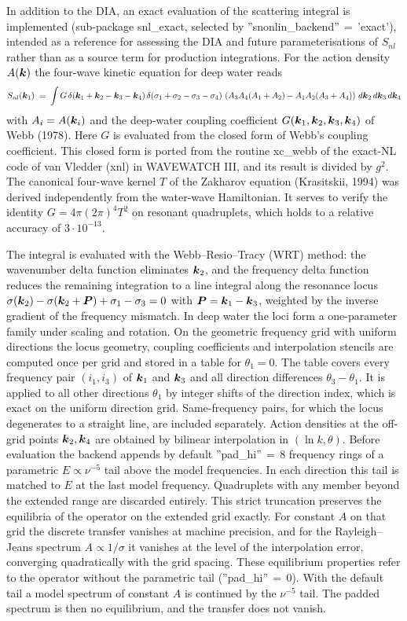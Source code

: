 \documentclass[12pt]{article}
\newcommand{\beq}  { \begin{eqnarray} }
\newcommand{\eeq}  { \end{eqnarray}}
\renewcommand{\v}[1]{{\mbox{\boldmath$ #1 $}}}  %
\newcommand{\lk}{\left(}
\newcommand{\rk}{\right)}
\begin{document}
In addition to the DIA, an exact evaluation of the scattering integral is
implemented (sub-package snl\_exact, selected by
''snonlin\_backend''$\,=\,$'exact'), intended as a reference for assessing the
DIA and future parameterisations of $S_{nl}$ rather than as a source term for
production integrations.
For the action density $A(\v k)$ the four-wave kinetic equation for deep water
reads
\beq \label{eq:snl_exact}
 S_{nl}(\v k_1) \;=\; \int G\,
 \delta(\v k_1+\v k_2-\v k_3-\v k_4)\, \delta(\sigma_1+\sigma_2-\sigma_3-\sigma_4)\,
 \lk A_3 A_4 (A_1+A_2) - A_1 A_2 (A_3+A_4) \rk \, d\v k_2\, d\v k_3\, d\v k_4
\eeq
with $A_i = A(\v k_i)$ and the deep-water coupling coefficient
$G(\v k_1,\v k_2,\v k_3,\v k_4)$ of Webb (1978).
Here $G$ is evaluated from the closed form of Webb's coupling coefficient.
This closed form is ported from the routine xc\_webb of the exact-NL code of
van Vledder (xnl) in WAVEWATCH III, and its result is divided by $g^2$.
The canonical four-wave kernel $T$ of the Zakharov equation (Krasitskii, 1994)
was derived independently from the water-wave Hamiltonian.
It serves to verify the identity $G = 4 \pi (2\pi)^4 T^2$ on resonant
quadruplets, which holds to a relative accuracy of $3 \cdot 10^{-13}$.

The integral is evaluated with the Webb--Resio--Tracy (WRT) method: the
wavenumber delta function eliminates $\v k_2$, and the frequency delta function
reduces the remaining integration to a line integral along the resonance locus
$\sigma(\v k_2) - \sigma(\v k_2 + \v P) + \sigma_1 - \sigma_3 = 0$ with
$\v P = \v k_1 - \v k_3$, weighted by the inverse gradient of the frequency
mismatch.
In deep water the loci form a one-parameter family under scaling and rotation.
On the geometric frequency grid with uniform directions the locus geometry,
coupling coefficients and interpolation stencils are computed once per grid
and stored in a table for $\theta_1 = 0$.
The table covers every frequency pair $(i_1, i_3)$ of $\v k_1$ and $\v k_3$
and all direction differences $\theta_3 - \theta_1$.
It is applied to all other directions $\theta_1$ by integer shifts of the
direction index, which is exact on the uniform direction grid.
Same-frequency pairs, for which the locus degenerates to a straight line, are
included separately.
Action densities at the off-grid points $\v k_2, \v k_4$ are obtained by
bilinear interpolation in $(\ln k, \theta)$.
Before evaluation the backend appends by default ''pad\_hi''$\,=\,8$ frequency
rings of a parametric $E \propto \nu^{-5}$ tail above the model frequencies.
In each direction this tail is matched to $E$ at the last model frequency.
Quadruplets with any member beyond the extended range are discarded entirely.
This strict truncation preserves the equilibria of the operator on the
extended grid exactly.
For constant $A$ on that grid the discrete transfer vanishes at machine
precision, and for the Rayleigh--Jeans spectrum $A \propto 1/\sigma$ it
vanishes at the level of the interpolation error, converging quadratically
with the grid spacing.
These equilibrium properties refer to the operator without the parametric
tail (''pad\_hi''$\,=\,0$).
With the default tail a model spectrum of constant $A$ is continued by the
$\nu^{-5}$ tail.
The padded spectrum is then no equilibrium, and the transfer does not vanish.
\end{document}
